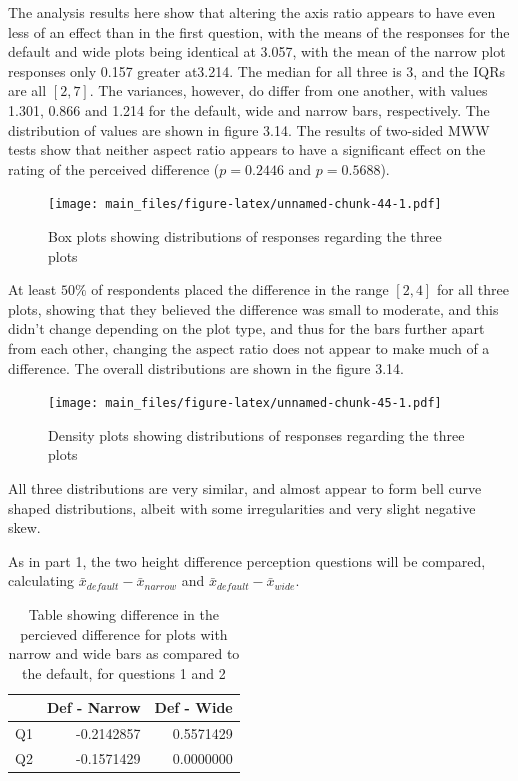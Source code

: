 \documentclass[
  11pt,
]{book}
\begin{document}
The analysis results here show that altering the axis ratio appears to
have even less of an effect than in the first question, with the means
of the responses for the default and wide plots being identical at
3.057, with the mean of the narrow plot responses only 0.157 greater
at3.214. The median for all three is 3, and the IQRs are all \([2, 7]\).
The variances, however, do differ from one another, with values 1.301,
0.866 and 1.214 for the default, wide and narrow bars, respectively. The
distribution of values are shown in figure 3.14. The results of
two-sided MWW tests show that neither aspect ratio appears to have a
significant effect on the rating of the perceived difference
(\(p=0.2446\) and \(p=0.5688\)).

\begin{figure}
\centering
\texttt{[image: main\_files/figure-latex/unnamed-chunk-44-1.pdf]}
\caption{Box plots showing distributions of responses regarding the
three plots}
\end{figure}

At least \(50\%\) of respondents placed the difference in the range
\([2, 4]\) for all three plots, showing that they believed the
difference was small to moderate, and this didn't change depending on
the plot type, and thus for the bars further apart from each other,
changing the aspect ratio does not appear to make much of a difference.
The overall distributions are shown in the figure 3.14.

\begin{figure}
\centering
\texttt{[image: main\_files/figure-latex/unnamed-chunk-45-1.pdf]}
\caption{Density plots showing distributions of responses regarding the
three plots}
\end{figure}

All three distributions are very similar, and almost appear to form bell
curve shaped distributions, albeit with some irregularities and very
slight negative skew.

As in part 1, the two height difference perception questions will be
compared, calculating \(\bar{x}_{default} - \bar{x}_{narrow}\) and
\(\bar{x}_{default} - \bar{x}_{wide}\).

\begin{table}[!h]

\caption{\label{tab:unnamed-chunk-47}Table showing difference in the percieved difference for plots with narrow and wide bars as compared to the default, for questions 1 and 2}
\centering
\begin{tabular}[t]{l|r|r}
\hline
  & Def - Narrow & Def - Wide\\
\hline
Q1 & -0.2142857 & 0.5571429\\
\hline
Q2 & -0.1571429 & 0.0000000\\
\hline
\end{tabular}
\end{table}
\end{document}
